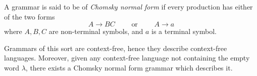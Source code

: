 \documentclass[12pt]{article}
\begin{document}
A grammar is said to be of \emph{Chomsky normal form} if every production
has either of the two forms
 \[A \to BC \qquad \mbox{ or } \qquad A \to a \]
where $A,B,C$ are non-terminal symbols, and $a$ is a terminal symbol.

Grammars of this sort are context-free, hence they describe context-free
languages.  Moreover, given any context-free language not containing the empty word $\lambda$, there exists a
Chomsky normal form grammar which describes it.
\end{document}
